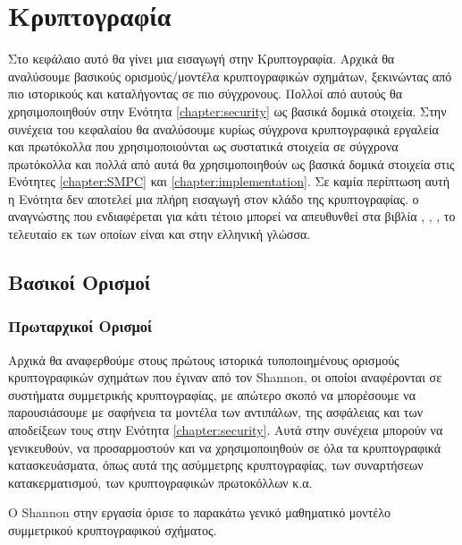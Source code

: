 \chapter{Κρυπτογραφία}
\label{chapter:cryptography}

Στο κεφάλαιο αυτό θα γίνει μια εισαγωγή στην Κρυπτογραφία. Αρχικά θα αναλύσουμε βασικούς ορισμούς/μοντέλα κρυπτογραφικών σχημάτων, ξεκινώντας από πιο ιστορικούς και καταλήγοντας σε πιο σύγχρονους. Πολλοί από αυτούς θα χρησιμοποιηθούν στην Ενότητα \ref{chapter:security} ως βασικά δομικά στοιχεία. Στην συνέχεια του κεφαλαίου θα αναλύσουμε κυρίως σύγχρονα κρυπτογραφικά εργαλεία και πρωτόκολλα που χρησιμοποιούνται ως συστατικά στοιχεία σε σύγχρονα πρωτόκολλα και πολλά από αυτά θα χρησιμοποιηθούν ως βασικά δομικά στοιχεία στις Ενότητες \ref{chapter:SMPC} και \ref{chapter:implementation}. Σε καμία περίπτωση αυτή η Ενότητα δεν αποτελεί μια πλήρη εισαγωγή στον κλάδο της κρυπτογραφίας. ο αναγνώστης που ενδιαφέρεται για κάτι τέτοιο μπορεί να απευθυνθεί στα βιβλία \cite{boneh2020graduate}, \cite{hoffstein2008introduction}, \cite{pagourtzis2016computational}, το τελευταίο εκ των οποίων είναι και στην ελληνική γλώσσα.

\section{Βασικοί Ορισμοί}

\subsection{Πρωταρχικοί Ορισμοί}

Αρχικά θα αναφερθούμε στους πρώτους ιστορικά τυποποιημένους ορισμούς κρυπτογραφικών σχημάτων που έγιναν από τον Shannon, οι οποίοι αναφέρονται σε συστήματα συμμετρικής κρυπτογραφίας, με απώτερο σκοπό να μπορέσουμε να παρουσιάσουμε με σαφήνεια τα μοντέλα των αντιπάλων, της ασφάλειας και των αποδείξεων τους στην Ενότητα \ref{chapter:security}. Αυτά στην συνέχεια μπορούν να γενικευθούν, να προσαρμοστούν και να χρησιμοποιηθούν σε όλα τα κρυπτογραφικά κατασκευάσματα, όπως αυτά της ασύμμετρης κρυπτογραφίας, των συναρτήσεων κατακερματισμού, των κρυπτογραφικών πρωτοκόλλων κ.α.

Ο Shannon στην εργασία \cite{shannon1945mathematical} όρισε το παρακάτω γενικό μαθηματικό μοντέλο συμμετρικού κρυπτογραφικού σχήματος.

